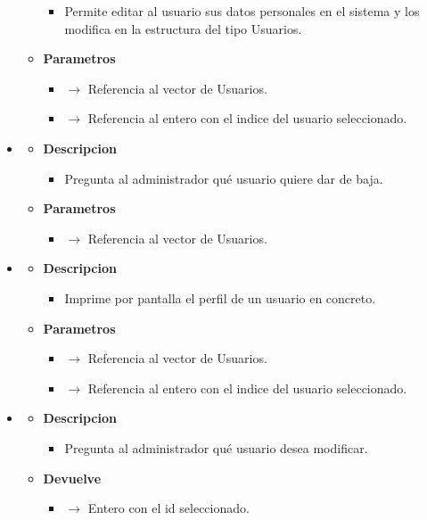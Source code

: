 \begin{itemize}
\begin{itemize}
\begin{itemize}
			\item Permite editar al usuario sus datos personales en el sistema y los modifica en la estructura del tipo Usuarios.
		\end{itemize}
        \item \textbf{Parametros}
		\begin{itemize}
			\item {} $\rightarrow$ Referencia al vector de Usuarios.
            \item {} $\rightarrow$ Referencia al entero con el indice del usuario seleccionado.
		\end{itemize}
	\end{itemize}
    \item{}
	\begin{itemize}
		\item \textbf{Descripcion}
        \begin{itemize}
			\item Pregunta al administrador qué usuario quiere dar de baja.
		\end{itemize}
        \item \textbf{Parametros}
		\begin{itemize}
			\item {} $\rightarrow$ Referencia al vector de Usuarios.
		\end{itemize}
	\end{itemize}
    \item{}
	\begin{itemize}
		\item \textbf{Descripcion}
        \begin{itemize}
			\item Imprime por pantalla el perfil de un usuario en concreto.
		\end{itemize}
        \item \textbf{Parametros}
		\begin{itemize}
			\item {} $\rightarrow$ Referencia al vector de Usuarios.
            \item {} $\rightarrow$ Referencia al entero con el indice del usuario seleccionado.
		\end{itemize}
	\end{itemize}
    \item{}
	\begin{itemize}
		\item \textbf{Descripcion}
        \begin{itemize}
			\item Pregunta al administrador qué usuario desea modificar.
		\end{itemize}
        \item \textbf{Devuelve}
		\begin{itemize}
			\item {} $\rightarrow$ Entero con el id seleccionado.
		\end{itemize}
	\end{itemize}
\end{itemize}
\newpage
